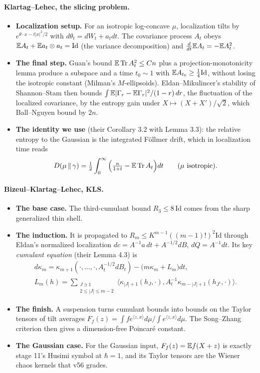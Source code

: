 \label{sec:readings}
\paragraph{Klartag--Lehec, the slicing problem.}
\begin{itemize}[leftmargin=*]
\item \textbf{Localization setup.} For an isotropic log-concave $\mu$, localization tilts by $e^{\theta\cdot x-t|x|^2/2}$ with
$d\theta_t=dW_t+a_tdt$. The covariance process $A_t$ obeys $\mathbb E A_t+\mathbb E a_t\otimes a_t=\mathrm{Id}$ (the variance decomposition) and
$\frac d{dt}\mathbb E A_t=-\mathbb E A_t^2$.
\item \textbf{The final step.} Guan's bound $\mathbb E\operatorname{Tr} A_t^2\le Cn$ plus a projection-monotonicity lemma produce a subspace and a
time $t_0\sim1$ with $\mathbb E A_{t_0}\ge\frac14\mathrm{Id}$, without losing the isotropic constant (Milman's $M$-ellipsoids).
Eldan--Mikulincer's stability of Shannon--Stam then bounds $\int\mathbb E|\Gamma_r-\mathbb E\Gamma_r|^2/(1-r)\,dr$, the fluctuation of the localized
covariance, by the entropy gain under $X\mapsto(X+X')/\sqrt2$, which Ball--Nguyen bound by $2n$.
\item \textbf{The identity we use} (their Corollary 3.2 with Lemma 3.3): the relative entropy to the Gaussian is the integrated
F\"ollmer drift, which in localization time reads
\[
D(\mu\,\|\,\gamma)=\tfrac12\int_0^\infty\Big(\tfrac n{1+t}-\mathbb E\operatorname{Tr} A_t\Big)dt\qquad(\mu\ \text{isotropic}).
\]
\end{itemize}

\paragraph{Bizeul--Klartag--Lehec, KLS.}
\begin{itemize}[leftmargin=*]
\item \textbf{The base case.} The third-cumulant bound $R_3\le8\,\mathrm{Id}$ comes from the sharp generalized thin shell.
\item \textbf{The induction.} It is propagated to $R_m\le K^{m-1}((m-1)!)^2\mathrm{Id}$ through Eldan's normalized localization
$dc=A^{-1}a\,dt+A^{-1/2}dB$, $dQ=A^{-1}dt$. Its key \emph{cumulant equation} (their Lemma 4.3) is
\begin{gather*}
d\kappa_m=\kappa_{m+1}(\cdot,\dots,\cdot,A_t^{-1/2}dB_t)-\big(m\kappa_m+L_m\big)dt,\\
L_m(h)=\!\!\!\sum_{\substack{J\ni1\\2\le|J|\le m-2}}\!\!\!\big\langle\kappa_{|J|+1}(h_J,\cdot),A_t^{-1}\kappa_{m-|J|+1}(h_{J^c},\cdot)\big\rangle .
\end{gather*}
\item \textbf{The finish.} A suspension turns cumulant bounds into bounds on the Taylor tensors of tilt averages
$F_f(z)=\int fe^{\langle z,x\rangle}d\mu/\int e^{\langle z,x\rangle}d\mu$. The Song--Zhang criterion then gives a dimension-free Poincar\'e
constant.
\item \textbf{The Gaussian case.} For the Gaussian input, $F_f(z)=\mathbb E f(X+z)$ is exactly stage 11's Husimi symbol at $\hbar=1$, and its
Taylor tensors are the Wiener chaos kernels that v56 grades.
\end{itemize}

